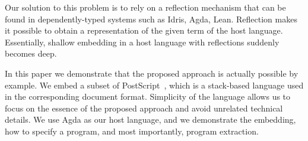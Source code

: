 \documentclass[sigplan,anonymous,review]{acmart}
\begin{document}
Our solution to this problem is to rely on a reflection mechanism that
can be found in dependently-typed systems such as Idris, Agda, Lean.
Reflection makes it possible to obtain a representation of the
given term of the host language.  Essentially, shallow embedding in
a host language with reflections suddenly becomes deep.

In this paper we demonstrate that the proposed approach is actually possible
by example.  We embed a subset of PostScript~\cite{}, which is a stack-based
language used in the corresponding document format.  Simplicity of the language
allows us to focus on the essence of the proposed approach and avoid unrelated
technical details.  We use Agda as our host language, and we demonstrate the
embedding, how to specify a program, and most importantly, program extraction.


%
\end{document}
